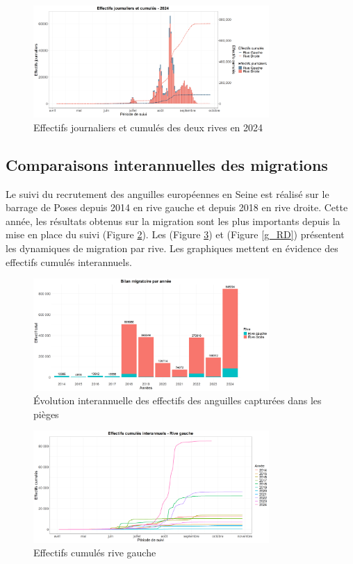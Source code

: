 \documentclass[11pt,titlepage,twoside]{article}\usepackage[]{graphicx}\usepackage[table]{xcolor}
\begin{document}
\begin{figure}[htpb]
\centering
\includegraphics[width=0.8\textwidth]{graph_oral.png}
\caption{Effectifs journaliers et cumulés des deux rives en 2024}
\label{graph_oral}
\end{figure}

\subsection{Comparaisons interannuelles des migrations}

Le suivi du recrutement des anguilles européennes en Seine est réalisé sur le barrage de Poses depuis 2014 en rive gauche et depuis 2018 en rive droite.  Cette année, les résultats obtenus sur la migration sont les plus importants depuis la mise en place du suivi (Figure \ref{graph_annee_oral}). Les (Figure \ref{g_RG}) et (Figure \ref{g_RD}) présentent les dynamiques de migration par rive. Les graphiques mettent en évidence des effectifs cumulés interannuels. 


\begin{figure}[htpb]
\centering
\includegraphics[width=0.8\textwidth]{graph_annee_oral.png}
\caption{Évolution interannuelle des effectifs des anguilles capturées dans les pièges}
\label{graph_annee_oral}
\end{figure}

\begin{figure}[htpb]
\centering
\includegraphics[width=0.8\textwidth]{g_RG.png}
\caption{Effectifs cumulés rive gauche}
\label{g_RG}
\end{figure}
\end{document}
